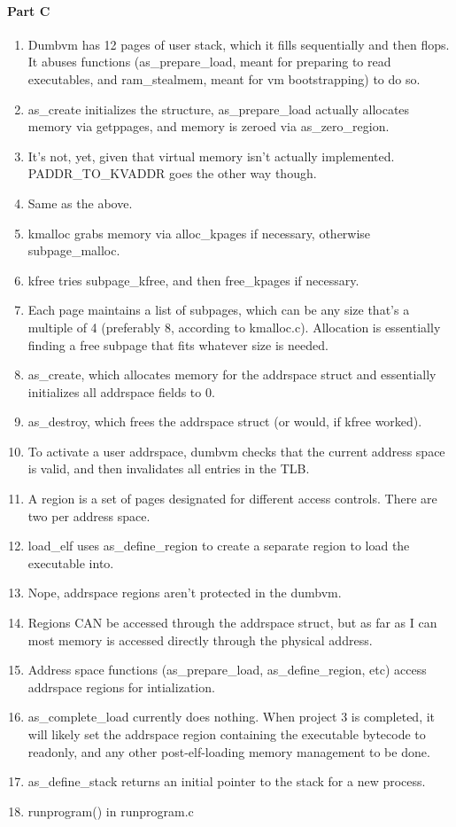 \documentclass{proc}
\begin{document}
\paragraph{Part C}
\begin{enumerate}
	\item Dumbvm has 12 pages of user stack, which it fills sequentially and then flops. It abuses functions (as\_prepare\_load, meant for preparing to read executables, and ram\_stealmem, meant for vm bootstrapping) to do so.
	\item as\_create initializes the structure, as\_prepare\_load actually allocates memory via getppages, and memory is zeroed via as\_zero\_region.
	\item It's not, yet, given that virtual memory isn't actually implemented. PADDR\_TO\_KVADDR goes the other way though.
	\item Same as the above.
	\item kmalloc grabs memory via alloc\_kpages if necessary, otherwise subpage\_malloc.
	\item kfree tries subpage\_kfree, and then free\_kpages if necessary.
	\item Each page maintains a list of subpages, which can be any size that's a multiple of 4 (preferably 8, according to kmalloc.c). Allocation is essentially finding a free subpage that fits whatever size is needed.
	\item as\_create, which allocates memory for the addrspace struct and essentially initializes all addrspace fields to 0.
	\item as\_destroy, which frees the addrspace struct (or would, if kfree worked).
	\item To activate a user addrspace, dumbvm checks that the current address space is valid, and then invalidates all entries in the TLB.
	\item A region is a set of pages designated for different access controls. There are two per address space.
	\item load\_elf uses as\_define\_region to create a separate region to load the executable into.
	\item Nope, addrspace regions aren't protected in the dumbvm.
	\item Regions CAN be accessed through the addrspace struct, but as far as I can most memory is accessed directly through the physical address.
	\item Address space functions (as\_prepare\_load, as\_define\_region, etc) access addrspace regions for intialization.
	\item as\_complete\_load currently does nothing. When project 3 is completed, it will likely set the addrspace region containing the executable bytecode to readonly, and any other post-elf-loading memory management to be done.
	\item as\_define\_stack returns an initial pointer to the stack for a new process.
	\item runprogram() in runprogram.c
\end{enumerate}
\end{document}
